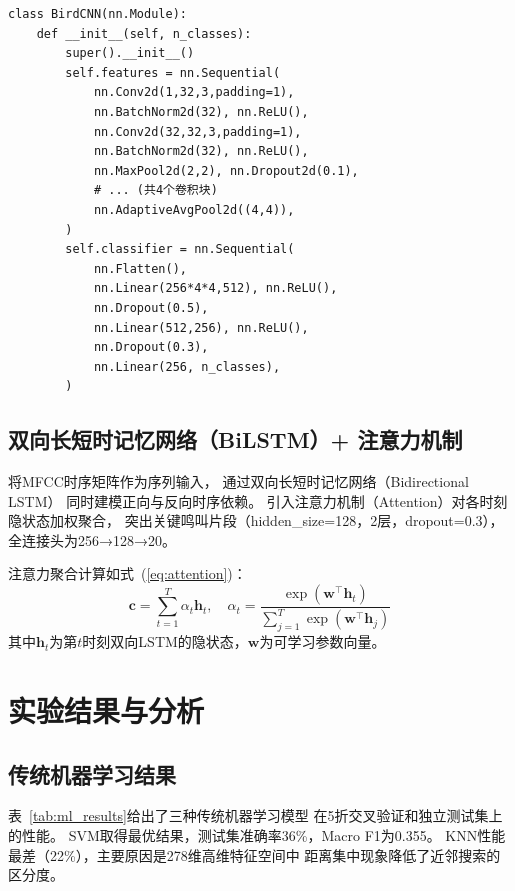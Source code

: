 \documentclass[10pt,twoside,twocolumn]{article}
\begin{document}
\begin{lstlisting}[caption={CNN模型结构（04\_cnn\_model.py节选）}]
class BirdCNN(nn.Module):
    def __init__(self, n_classes):
        super().__init__()
        self.features = nn.Sequential(
            nn.Conv2d(1,32,3,padding=1),
            nn.BatchNorm2d(32), nn.ReLU(),
            nn.Conv2d(32,32,3,padding=1),
            nn.BatchNorm2d(32), nn.ReLU(),
            nn.MaxPool2d(2,2), nn.Dropout2d(0.1),
            # ... (共4个卷积块)
            nn.AdaptiveAvgPool2d((4,4)),
        )
        self.classifier = nn.Sequential(
            nn.Flatten(),
            nn.Linear(256*4*4,512), nn.ReLU(),
            nn.Dropout(0.5),
            nn.Linear(512,256), nn.ReLU(),
            nn.Dropout(0.3),
            nn.Linear(256, n_classes),
        )
\end{lstlisting}

\subsection{双向长短时记忆网络（BiLSTM）+ 注意力机制}

将MFCC时序矩阵作为序列输入，
通过双向长短时记忆网络（Bidirectional LSTM）\cite{hochreiter1997}
同时建模正向与反向时序依赖。
引入注意力机制（Attention）对各时刻隐状态加权聚合，
突出关键鸣叫片段（hidden\_size=128，2层，dropout=0.3），
全连接头为256→128→20。

注意力聚合计算如式~(\ref{eq:attention})：
\begin{equation}
  \mathbf{c} = \sum_{t=1}^{T} \alpha_t \mathbf{h}_t, \quad
  \alpha_t = \frac{\exp(\mathbf{w}^\top \mathbf{h}_t)}
                  {\sum_{j=1}^{T}\exp(\mathbf{w}^\top \mathbf{h}_j)}
  \label{eq:attention}
\end{equation}
其中$\mathbf{h}_t$为第$t$时刻双向LSTM的隐状态，$\mathbf{w}$为可学习参数向量。

\section{实验结果与分析}

\subsection{传统机器学习结果}

表~\ref{tab:ml_results}给出了三种传统机器学习模型
在5折交叉验证和独立测试集上的性能。
SVM取得最优结果，测试集准确率36\%，Macro F1为0.355。
KNN性能最差（22\%），主要原因是278维高维特征空间中
距离集中现象降低了近邻搜索的区分度。
\end{document}
